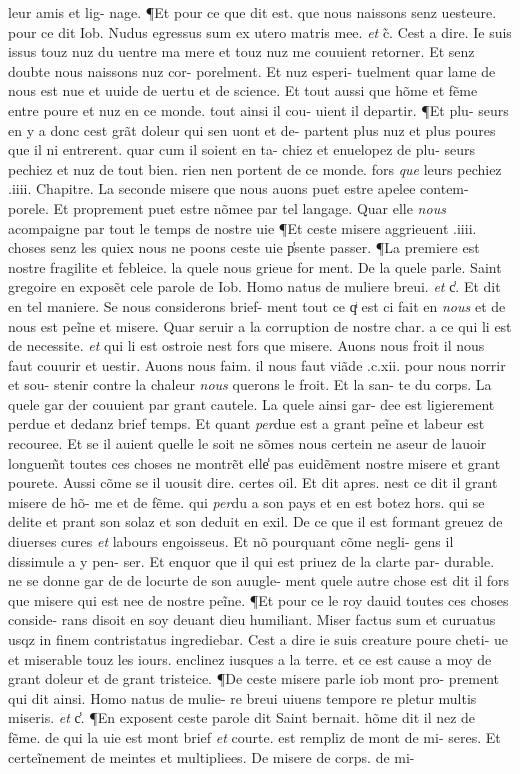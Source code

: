 \documentclass{article}
\begin{document}
\begin{pages}
leur amis et lig- nage. ¶Et pour ce que dit est. que nous naissons senz uesteure. pour ce dit Iob. Nudus egressus sum ex utero matris mee. \textit{et} c̃. Cest a dire. Ie suis issus touz nuz du uentre ma mere et touz nuz me couuient retorner. Et senz doubte nous naissons nuz cor- porelment. Et nuz esperi- tuelment quar lame de nous est nue et uuide de uertu et de science. Et tout aussi que hõme et fẽme entre poure et nuz en ce monde. tout ainsi il cou- uient il departir. ¶Et plu- seurs en y a donc cest grãt doleur qui sen uont et de- partent plus nuz et plus poures que il ni entrerent. quar cum il soient en ta- chiez et enuelopez de plu- seurs pechiez et nuz de tout bien. rien nen portent de ce monde. fors \textit{que} leurs pechiez .iiii. Chapitre. La seconde misere que nous auons puet estre apelee contem- porele. Et proprement puet estre nõmee par tel langage. Quar elle \textit{nous} acompaigne par tout le temps de nostre uie ¶Et ceste misere aggrieuent .iiii. choses senz les quiex nous ne poons ceste uie p̾sente passer. ¶La premiere est nostre fragilite et febleice. la quele nous grieue for ment. De la quele parle. Saint gregoire en exposẽt cele parole de Iob. Homo natus de muliere breui. \textit{et} c̾. Et dit en tel maniere. Se nous considerons brief- ment tout ce qͥ est ci fait en \textit{nous} et de nous est peĩne et misere. Quar seruir a la corruption de nostre char. a ce qui li est de necessite. \textit{et} qui li est ostroie nest fors que misere. Auons nous froit il nous faut couurir et uestir. Auons nous faim. il nous faut viãde .c.xii. pour nous norrir et sou- stenir contre la chaleur \textit{nous} querons le froit. Et la san- te du corps. La quele gar der couuient par grant cautele. La quele ainsi gar- dee est ligierement perdue et dedanz brief temps. Et quant \textit{per}due est a grant peĩne et labeur est recouree. Et se il auient quelle le soit ne sõmes nous certein ne aseur de lauoir longuem̃t toutes ces choses ne montrẽt elle̾ pas euidẽment nostre misere et grant pourete. Aussi cõme se il uousit dire. certes oil. Et dit apres. nest ce dit il grant misere de hõ- me et de fẽme. qui \textit{per}du a son pays et en est botez hors. qui se delite et prant son solaz et son deduit en exil. De ce que il est formant greuez de diuerses cures \textit{et} labours engoisseus. Et nõ pourquant cõme negli- gens il dissimule a y pen- ser. Et enquor que il qui est priuez de la clarte par- durable. ne se donne gar de de locurte de son auugle- ment quele autre chose est dit il fors que misere qui est nee de nostre peĩne. ¶Et pour ce le roy dauid toutes ces choses conside- rans disoit en soy deuant dieu humiliant. Miser factus sum et curuatus usqz in finem contristatus ingrediebar. Cest a dire ie suis creature poure cheti- ue et miserable touz les iours. enclinez iusques a la terre. et ce est cause a moy de grant doleur et de grant tristeice. ¶De ceste misere parle iob mont pro- prement qui dit ainsi. Homo natus de mulie- re breui uiuens tempore re pletur multis miseris. \textit{et} c̾. ¶En exposent ceste parole dit Saint bernait. hõme dit il nez de fẽme. de qui la uie est mont brief \textit{et} courte. est rempliz de mont de mi- seres. Et certeĩnement de meintes et multipliees. De misere de corps. de mi- 
\end{pages}
\end{document}
